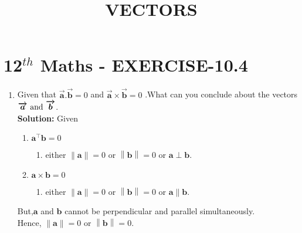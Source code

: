 \documentclass[10pt]{article}
\newcommand{\solution}{\noindent \textbf{Solution: }}
\providecommand{\norm}[1]{\left\lVert#1\right\rVert}
\let\vec\mathbf{}
\begin{document}
\begin{center}
\title{\textbf{VECTORS}}
\date{\vspace{-5ex}} %
\maketitle
\end{center}

\section{12$^{th}$ Maths - EXERCISE-10.4}

\begin{enumerate}
\item Given that $\boldsymbol{\overrightarrow{a}.\overrightarrow{b}}=0$ and $\boldsymbol{\overrightarrow{a}\times\overrightarrow{b}}=0$ .What can you conclude about the vectors $\boldsymbol{\overrightarrow{a}$ and $\overrightarrow{b}}$.\\  

\solution
Given  

\begin{enumerate}
\item $\vec{a}^{\top}\vec{b}=0$
\begin{enumerate}
\item either $\norm{\vec{a}}=0$ or $\norm{\vec{b}}=0$ or $\vec{a}\perp\vec{b}$.
\end{enumerate}
\item $\vec{a}\times\vec{b}=0$
\begin{enumerate}
\item either $\norm{\vec{a}}=0$ or $\norm{\vec{b}}=0$ or  $\vec{a}\parallel\vec{b}$.
\end{enumerate}
\end{enumerate}
But,$\vec{a}$ and $\vec{b}$ cannot be perpendicular and parallel simultaneously.\\
Hence, $\norm{\vec{a}}=0$ or $\norm{\vec{b}}=0$.

\end{enumerate}
\end{document}

